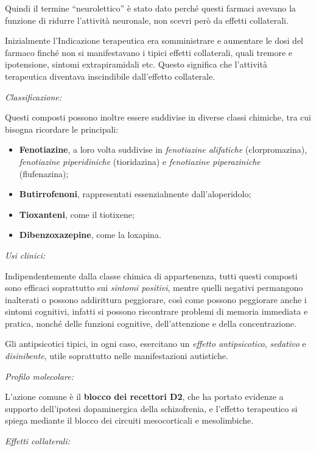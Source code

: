 Quindi il termine ``neurolettico'' è stato dato perché questi farmaci
avevano la funzione di ridurre l'attività neuronale, non scevri però da
effetti collaterali.

Inizialmente l'Indicazione terapeutica era somministrare e aumentare le
dosi del farmaco finché non si manifestavano i tipici effetti
collaterali, quali tremore e ipotensione, sintomi extrapiramidali etc.
Questo significa che l'attività terapeutica diventava inscindibile
dall'effetto collaterale.

\emph{\emph{Classificazione:}}

Questi composti possono inoltre essere suddivise in diverse classi
chimiche, tra cui bisogna ricordare le principali:

\begin{itemize}
\item
  \textbf{Fenotiazine}, a loro volta suddivise in \emph{fenotiazine
  alifatiche} (clorpromazina), \emph{fenotiazine piperidiniche}
  (tioridazina) e \emph{fenotiazine piperaziniche} (flufenazina);
\item
  \textbf{Butirrofenoni}, rappresentati essenzialmente dall'aloperidolo;
\item
  \textbf{Tioxanteni}, come il tiotixene;
\item
  \textbf{Dibenzoxazepine}, come la loxapina.
\end{itemize}

\emph{\emph{Usi clinici:}}

Indipendentemente dalla classe chimica di appartenenza, tutti questi
composti sono efficaci soprattutto sui \emph{sintomi positivi}, mentre
quelli negativi permangono inalterati o possono addirittura peggiorare,
così come possono peggiorare anche i sintomi cognitivi, infatti si
possono riscontrare problemi di memoria immediata e pratica, nonché
delle funzioni cognitive, dell'attenzione e della concentrazione.

Gli antipsicotici tipici, in ogni caso, esercitano un \emph{effetto
antipsicotico}, \emph{sedativo} e \emph{disinibente}, utile soprattutto
nelle manifestazioni autistiche.

\emph{\emph{Profilo molecolare:}}

L'azione comune è il \textbf{blocco dei recettori D2}, che ha portato
evidenze a supporto dell'ipotesi dopaminergica della schizofrenia, e
l'effetto terapeutico si spiega mediante il blocco dei circuiti
mesocorticali e mesolimbiche.

\emph{\emph{Effetti collaterali:}}

